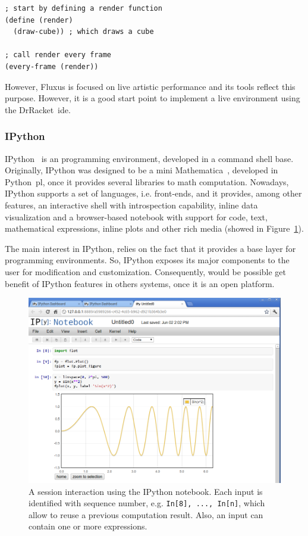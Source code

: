 \lstset{style=scheme}
\begin{lstlisting}
; start by defining a render function
(define (render)
  (draw-cube)) ; which draws a cube
  
; call render every frame
(every-frame (render))
\end{lstlisting}

However, Fluxus is focused on live artistic performance and its tools reflect this purpose. However, it is a good start point to implement a live environment using the DrRacket~\ac{ide}. 

\subsubsection{IPython}

IPython~\cite{PER-GRA:2007} is an programming environment, developed in a command shell base. Originally, IPython was designed to be a mini Mathematica~\cite{wolfram1991mathematica}, developed in Python~\ac{pl}, once it provides several libraries to math computation. Nowadays, IPython supports a set of languages, i.e. front-ends, and it provides, among other features, an interactive shell with introspection capability, inline data visualization and a browser-based notebook with support for code, text, mathematical expressions, inline plots and other rich media (showed in Figure~\ref{fig:ipython}). 

The main interest in IPython, relies on the fact that it provides a base layer for programming environments. So, IPython exposes its major components to the user for modification and customization. Consequently, would be possible get benefit of IPython features in others systems, once it is an open platform.  

\begin{figure}[h]
  \centering
  \includegraphics[scale=0.22]{img/ipython}
    \caption{A session interaction using the IPython notebook. Each input is identified with sequence number, e.g. {\tt In[8], ..., In[n]}, which allow to reuse a previous computation result. Also, an input can contain one or more expressions. }  
  \label{fig:ipython}
\end{figure}

